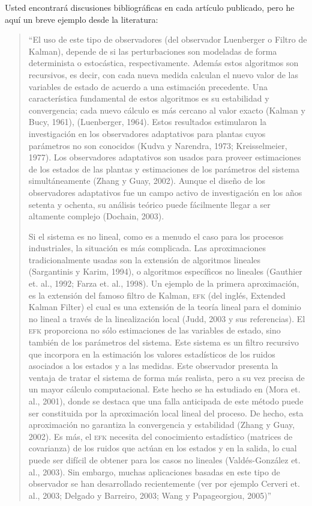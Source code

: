Usted encontrará discusiones bibliográficas en cada artículo publicado, pero he aquí un breve ejemplo desde la literatura: 

\begin{quote}
	``El uso de este tipo de observadores (del observador Luenberger o Filtro de Kalman), depende de si las perturbaciones son modeladas de forma determinista o estocástica, respectivamente. Además estos algoritmos son  recursivos, es decir, con cada nueva medida calculan el nuevo valor de las variables de estado de acuerdo a una estimación precedente. Una característica fundamental de estos algoritmos es su estabilidad y convergencia; cada nuevo cálculo es más cercano al valor exacto (Kalman y Bucy, 1961), (Luenberger, 1964). Estos resultados estimularon la investigación en los observadores adaptativos para plantas cuyos parámetros no son conocidos (Kudva y Narendra, 1973; Kreisselmeier, 1977). Los observadores adaptativos son usados para proveer estimaciones de los estados de las plantas y estimaciones de los parámetros del sistema simultáneamente (Zhang y Guay, 2002). Aunque el diseño de los observadores adaptativos fue un campo activo de investigación en los años setenta y ochenta, su análisis teórico puede fácilmente llegar a ser altamente complejo (Dochain, 2003).
	
	Si el sistema es no lineal, como es a menudo el caso para los procesos industriales, la situación es más complicada. Las aproximaciones tradicionalmente usadas son la extensión de algoritmos lineales (Sargantinis y Karim, 1994), o algoritmos específicos no lineales (Gauthier et. al., 1992; Farza et. al., 1998). Un ejemplo de la primera aproximación, es la extensión del famoso filtro de Kalman, \textsc{efk} (del inglés, Extended Kalman Filter) el cual es una extensión de la teoría lineal para el dominio no lineal a través de la linealización local (Judd, 2003 y sus referencias). El \textsc{efk} proporciona no sólo estimaciones de las variables de estado, sino también de los parámetros del sistema. Este sistema es un filtro recursivo que incorpora en la estimación los valores estadísticos de los ruidos asociados a los estados y a las medidas. Este observador presenta la ventaja de tratar el sistema de forma más realista, pero a su vez precisa de un mayor cálculo computacional. Este hecho se ha estudiado en (Mora et. al., 2001), donde se destaca que una falla anticipada de este método puede ser constituida por la aproximación local lineal del proceso. De hecho, esta aproximación no garantiza la convergencia y estabilidad (Zhang y Guay, 2002). Es más, el \textsc{efk} necesita del conocimiento estadístico (matrices de covarianza) de los ruidos que actúan en los estados y en la salida, lo cual puede ser difícil de obtener para los casos no lineales (Valdés-González et. al., 2003). Sin embargo, muchas aplicaciones basadas en este tipo de observador se han desarrollado recientemente (ver por ejemplo Cerveri et. al., 2003; Delgado y Barreiro, 2003; Wang y Papageorgiou, 2005)''
\end{quote}

